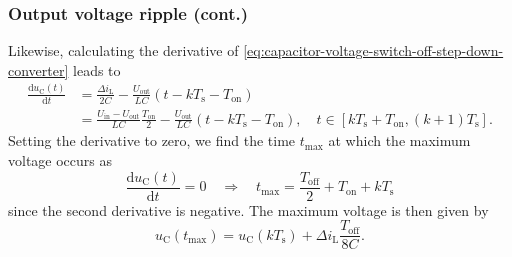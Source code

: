 \begin{frame}
    \frametitle{Output voltage ripple (cont.)}
    Likewise, calculating the derivative of \eqref{eq:capacitor-voltage-switch-off-step-down-converter} leads to
    \begin{equation}
        \begin{split}
            \frac{\mathrm{d}u_\mathrm{C}(t)}{\mathrm{d}t} &= \frac{\Delta i_\mathrm{L}}{2 C} - \frac{U_\mathrm{out}}{LC} (t-kT_\mathrm{s} - T_\mathrm{on})\\
                                                          &= \frac{U_\mathrm{in}-U_\mathrm{out}}{LC}\frac{T_\mathrm{on}}{2} -\frac{U_\mathrm{out}}{LC} (t-kT_\mathrm{s} - T_\mathrm{on}), \quad t\in [k T_\mathrm{s} + T_\mathrm{on}, (k+1) T_\mathrm{s}].
        \end{split}
    \end{equation}
    Setting the derivative to zero, we find the time $t_\mathrm{max}$ at which the maximum voltage occurs as
    \begin{equation}
        \frac{\mathrm{d}u_\mathrm{C}(t)}{\mathrm{d}t} = 0 \quad \Rightarrow \quad t_\mathrm{max} = \frac{T_\mathrm{off}}{2} + T_\mathrm{on} + k T_\mathrm{s}
    \end{equation}
    since the second derivative is negative. The maximum voltage is then given by
    \begin{equation}
        u_\mathrm{C}(t_\mathrm{max}) = u_\mathrm{C}(kT_\mathrm{s}) + \Delta i_\mathrm{L}\frac{T_\mathrm{off}}{8C}.
    \end{equation}
\end{frame}

